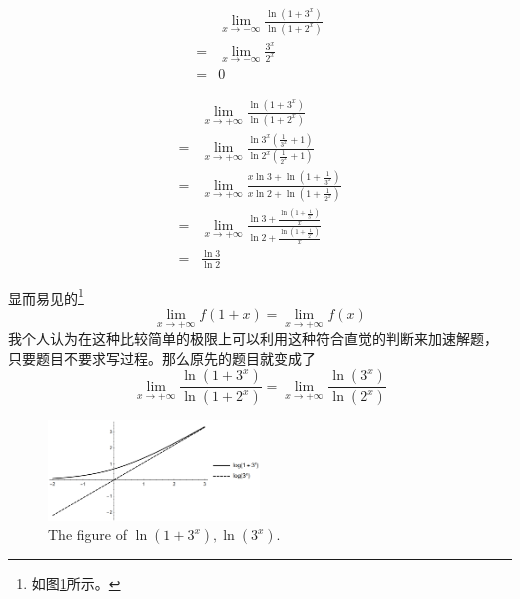 \begin{example}
    \begin{align*}
         &\lim_{x \to - \infty} \frac{\ln (1+ 3^x)}{\ln (1+ 2^x)} \\
        =&\lim_{x \to - \infty} \frac{3^x}{2^x} \\
        =&0
    \end{align*}
\end{example}

\begin{example}
    \begin{align*}
         &\lim_{x \to + \infty} \frac{\ln (1+3^x)}{\ln (1+2^x)}\\
        =&\lim_{x \to + \infty} \frac{\ln 3^x \left(\frac{1}{3^x} + 1\right)}{\ln 2^x \left(\frac{1}{2^x} + 1\right)}\\
        =&\lim_{x \to + \infty} 
        \frac{
            x\ln 3 + \ln \left(1+\frac{1}{3^x}\right)
        }{
            x\ln 2 + \ln \left(1+\frac{1}{2^x}\right)
        }\\
        =&\lim_{x \to + \infty} 
        \frac{
            \ln 3 + \frac{\ln \left(1+\frac{1}{3^x}\right)}{x}
        }{
            \ln 2 + \frac{\ln \left(1+\frac{1}{2^x}\right)}{x}
        }\\
        =&\frac{\ln 3}{\ln 2}
    \end{align*}

    显而易见的\footnote{如图\ref{fig:ln-1-plus-3-to-x-and-its-sibling}所示。}
    \[
        \lim_{x \to +\infty} f(1 + x) = \lim_{x \to +\infty} f(x)
    \]
    我个人认为在这种比较简单的极限上可以利用这种符合直觉的判断来加速解题，
    只要题目不要求写过程。那么原先的题目就变成了
    \[
         \lim_{x \to + \infty} \frac{\ln (1+3^x)}{\ln (1+2^x)} = 
         \lim_{x \to + \infty} \frac{\ln (3^x)}{\ln (2^x)}
    \]
\end{example}

\begin{figure}
    \centering
    \includegraphics[width=0.5\textwidth]{figure/ln(1plus3tox)-ln(3tox).png}
    \caption{The figure of $\ln(1+3^x), \ln(3^x)$.}
    \label{fig:ln-1-plus-3-to-x-and-its-sibling}
\end{figure}

